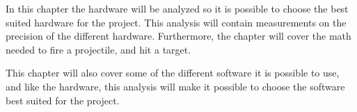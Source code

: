 In this chapter the hardware will be analyzed so it is possible to choose the best suited hardware for the project. This analysis will contain measurements on the precision of the different hardware. Furthermore, the chapter will cover the math needed to fire a projectile, and hit a target.

This chapter will also cover some of the different software it is possible to use, and like the hardware, this analysis will make it possible to choose the software best suited for the project.